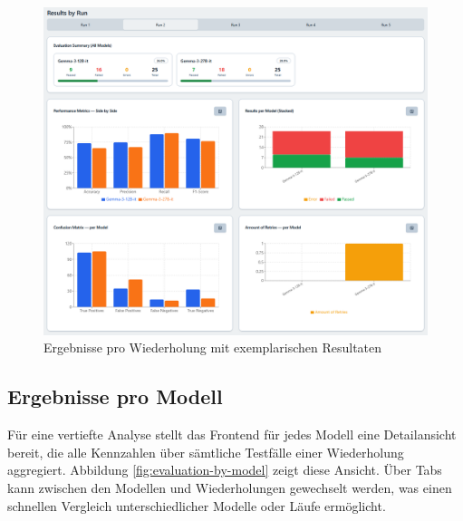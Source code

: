 \begin{figure}[h]
    \centering
    \includegraphics[width=\textwidth]{images/evaluation/evaluation-result-by-run_new}
    \caption{Ergebnisse pro Wiederholung mit exemplarischen Resultaten}
    \label{fig:evaluation-by-run}
\end{figure}

\subsection*{Ergebnisse pro Modell}

Für eine vertiefte Analyse stellt das Frontend für jedes Modell eine Detailansicht bereit, die alle Kennzahlen über sämtliche Testfälle einer Wiederholung aggregiert. Abbildung \ref{fig:evaluation-by-model} zeigt diese Ansicht. Über Tabs kann zwischen den Modellen und Wiederholungen gewechselt werden, was einen schnellen Vergleich unterschiedlicher Modelle oder Läufe ermöglicht.

